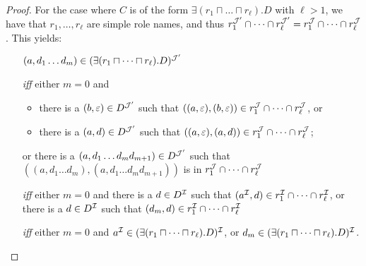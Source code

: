 \begin{proof}
    \noindent
    For the case where $C$ is of the form $\exists(r_1\sqcap\dots\sqcap
    r_\ell).D$ with $\ell>1$, we have that
    $r_1,\dots,r_\ell$ are simple role names, and thus
    $r_1^{\mathcal{J}'}\cap\dots\cap r_\ell^{\mathcal{J}'}=r_1^\mathcal{J}\cap\dots\cap r_\ell^\mathcal{J}$.
    This yields:
    \begin{itemize}
        \item[]
            $(a,d_1\dots d_m)\in(\exists(r_1\sqcap\dots\sqcap
            r_\ell).D)^{\mathcal{J}'}$
        \item[\emph{iff}]
            either $m=0$ and
            \begin{itemize}
              \item there is a $(b,\varepsilon)\in D^{\mathcal{J}'}$ such that
                  $((a,\varepsilon),(b,\varepsilon))\in r_1^\mathcal{J}\cap\dots\cap
                  r_\ell^\mathcal{J}$, or
              \item there is a $(a,d)\in D^{\mathcal{J}'}$ such that
                  $((a,\varepsilon),(a,d))\in r_1^\mathcal{J}\cap\dots\cap
                  r_\ell^\mathcal{J}$;
            \end{itemize}
            or there is a $(a,d_1\dots d_m d_{m+1})\in D^{\mathcal{J}'}$ such that
            $((a,d_1\dots d_m),(a,d_1\dots d_m d_{m+1}))$ is in
            $r_1^\mathcal{J}\cap\dots\cap r_\ell^\mathcal{J}$
        \item[\emph{iff}]
            either $m=0$ and there is a $d\in D^\mathcal{I}$ such that $(a^\mathcal{I},d)\in
            r_1^\mathcal{I}\cap\dots\cap r_\ell^\mathcal{I}$, or there is a $d\in D^\mathcal{I}$ such
            that $(d_m,d)\in r_1^\mathcal{I}\cap\dots\cap r_\ell^\mathcal{I}$
        \item[\emph{iff}]
            either $m=0$ and $a^\mathcal{I}\in(\exists(r_1\sqcap\dots\sqcap
            r_\ell).D)^\mathcal{I}$, or $d_m\in(\exists(r_1\sqcap\dots\sqcap
            r_\ell).D)^\mathcal{I}$.
    \end{itemize}


\end{proof}
